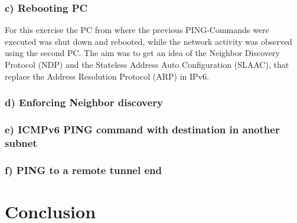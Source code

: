 \subsection{c) Rebooting PC}
For this exercise the PC from where the previous PING-Commands were executed was shut down and rebooted, while the network activity was observed using the second PC. The aim was to get an idea of the Neighbor Discovery Protocol (NDP) and the Stateless Address Auto Configuration (SLAAC), that replace the Address Resolution Protocol (ARP) in IPv6.
\subsection{d) Enforcing Neighbor discovery}
\subsection{e) ICMPv6 PING command with destination in another subnet}
\subsection{f) PING to a remote tunnel end}

\chapter{Conclusion}
\label{conclusion}